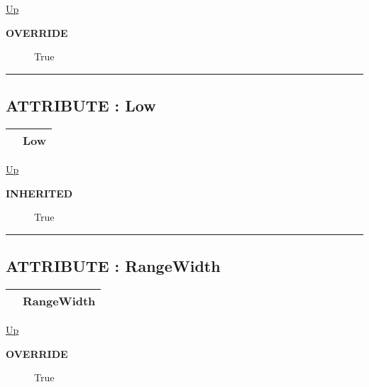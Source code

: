 \hyperlink{ecldoc:linearregression.ols.tdistribution}{Up}

\par

\par
\begin{description}
\item [\textbf{OVERRIDE}] True
\end{description}

\rule{\textwidth}{0.4pt}
\subsection*{ATTRIBUTE : Low}
\hypertarget{ecldoc:linearregression.ols.tdistribution.low}{}

{\renewcommand{\arraystretch}{1.5}
\begin{tabularx}{\textwidth}{|>{\raggedright\arraybackslash}l|X|}
\hline
\hspace{0pt} & Low \\
\hline
\end{tabularx}
}

\hyperlink{ecldoc:linearregression.ols.tdistribution}{Up}

\par

\par
\begin{description}
\item [\textbf{INHERITED}] True
\end{description}

\rule{\textwidth}{0.4pt}
\subsection*{ATTRIBUTE : RangeWidth}
\hypertarget{ecldoc:linearregression.ols.tdistribution.rangewidth}{}

{\renewcommand{\arraystretch}{1.5}
\begin{tabularx}{\textwidth}{|>{\raggedright\arraybackslash}l|X|}
\hline
\hspace{0pt} & RangeWidth \\
\hline
\end{tabularx}
}

\hyperlink{ecldoc:linearregression.ols.tdistribution}{Up}

\par

\par
\begin{description}
\item [\textbf{OVERRIDE}] True
\end{description}

